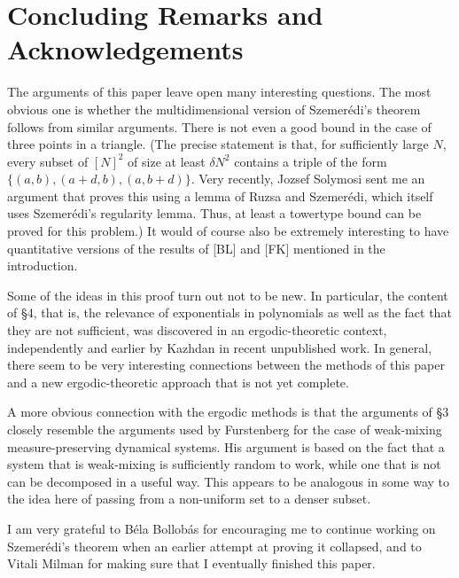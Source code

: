 \documentclass[10pt]{article}
\begin{document}
\section*{Concluding Remarks and Acknowledgements}
The arguments of this paper leave open many interesting questions. The most obvious one is whether the multidimensional version of Szemerédi's theorem follows from similar arguments. There is not even a good bound in the case of three points in a triangle. (The precise statement is that, for sufficiently large $N$, every subset of $[N]^{2}$ of size at least $\delta N^{2}$ contains a triple of the form $\{(a, b),(a+d, b),(a, b+d)\}$. Very recently, Jozsef Solymosi sent me an argument that proves this using a lemma of Ruzsa and Szemerédi, which itself uses Szemerédi's regularity lemma. Thus, at least a towertype bound can be proved for this problem.) It would of course also be extremely interesting to have quantitative versions of the results of [BL] and [FK] mentioned in the introduction.

Some of the ideas in this proof turn out not to be new. In particular, the content of §4, that is, the relevance of exponentials in polynomials as well as the fact that they are not sufficient, was discovered in an ergodic-theoretic context, independently and earlier by Kazhdan in recent unpublished work. In general, there seem to be very interesting connections between the methods of this paper and a new ergodic-theoretic approach that is not yet complete.

A more obvious connection with the ergodic methods is that the arguments of §3 closely resemble the arguments used by Furstenberg for the case of weak-mixing measure-preserving dynamical systems. His argument is based on the fact that a system that is weak-mixing is sufficiently random to work, while one that is not can be decomposed in a useful way. This appears to be analogous in some way to the idea here of passing from a non-uniform set to a denser subset.

I am very grateful to Béla Bollobás for encouraging me to continue working on Szemerédi's theorem when an earlier attempt at proving it collapsed, and to Vitali Milman for making sure that I eventually finished this paper.
\end{document}

